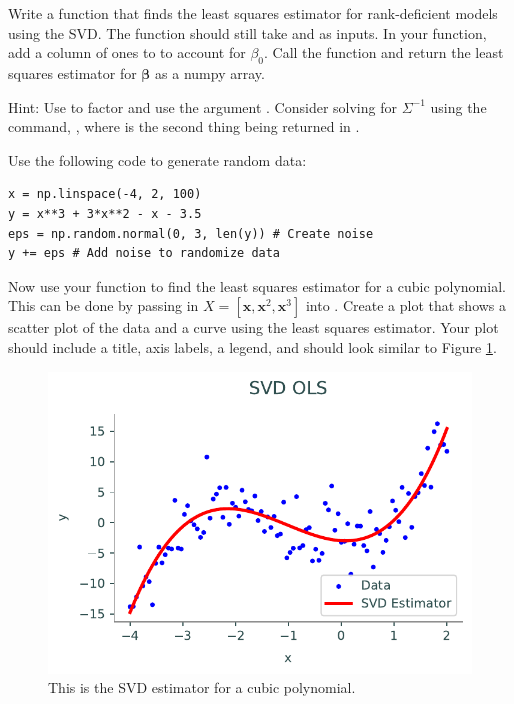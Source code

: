 \begin{problem}
Write a function that finds the least squares estimator for rank-deficient models using the SVD. 
The function should still take  and  as inputs. In your function, add a column of ones to  to account for $\beta_0$. Call the function  and return the least squares estimator for $\boldsymbol\beta$ as a numpy array.

Hint: Use  to factor  and use the argument . Consider solving for $\Sigma^{-1}$ using the command, , where  is the second thing being returned in .  
\end{problem}

\begin{problem}
Use the following code to generate random data:
\begin{lstlisting}
x = np.linspace(-4, 2, 100)
y = x**3 + 3*x**2 - x - 3.5 
eps = np.random.normal(0, 3, len(y)) # Create noise 
y += eps # Add noise to randomize data
\end{lstlisting} 
Now use your function  to find the least squares estimator for a cubic polynomial. 
This can be done by passing in $X=[\boldsymbol x, \boldsymbol x^2, \boldsymbol x^3]$ into .
Create a plot that shows a scatter plot of the data and a curve using the least squares estimator. 
Your plot should include a title, axis labels, a legend, and should look similar to Figure \ref{fig:prob4}.
\end{problem}

\begin{figure}[H]
    \includegraphics[width=.7\textwidth]{figures/cubic_polynomial.pdf}
    \caption{This is the SVD estimator for a cubic polynomial.}
    \label{fig:prob4}
\end{figure}

